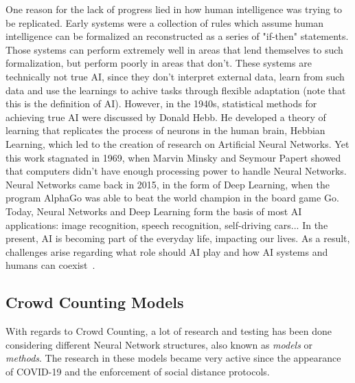 One reason for the lack of progress lied in how human intelligence was trying to be replicated. Early systems were a collection of rules which assume human intelligence can be formalized an reconstructed as a series of "if-then" statements. Those systems can perform extremely well in areas that lend themselves to such formalization, but perform poorly in areas that don't. These systems are technically not true AI, since they don't interpret external data, learn from such data and use the learnings to achive tasks through flexible adaptation (note that this is the definition of AI). However, in the 1940s, statistical methods for achieving true AI were discussed by Donald Hebb. He developed a theory of learning that replicates the process of neurons in the human brain, Hebbian Learning, which led to the creation of research on Artificial Neural Networks. Yet this work stagnated in 1969, when Marvin Minsky and Seymour Papert showed that computers didn't have enough processing power to handle Neural Networks.\\

Neural Networks came back in 2015, in the form of Deep Learning, when the program AlphaGo was able to beat the world champion in the board game Go. Today, Neural Networks and Deep Learning form the basis of most AI applications: image recognition, speech recognition, self-driving cars... In the present, AI is becoming part of the everyday life, impacting our lives. As a result, challenges arise regarding what role should AI play and how AI systems and humans can coexist~\citep{historia}.\\



\subsection{Crowd Counting Models}
With regards to Crowd Counting, a lot of research and testing has been done considering different Neural Network structures, also known as \textit{models} or \textit{methods}. 
The research in these models became very active since the appearance of COVID-19 and the enforcement of social distance protocols.\\

